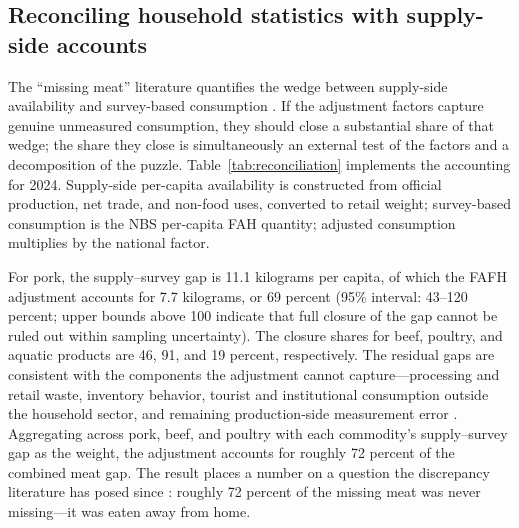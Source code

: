 \documentclass[preprint,12pt,authoryear]{elsarticle}
\begin{document}
\begin{table}[htbp]
\begin{threeparttable}
\begin{tablenotes}[flushleft]
\end{tablenotes}
\end{threeparttable}
\end{table}

\subsection{Reconciling household statistics with supply-side accounts}
\label{subsec:app_reconciliation}

The ``missing meat'' literature quantifies the wedge between supply-side availability and survey-based consumption \citep{MaHuangRozelle2004, YuAbler2014, Xiao2015}. If the adjustment factors capture genuine unmeasured consumption, they should close a substantial share of that wedge; the share they close is simultaneously an external test of the factors and a decomposition of the puzzle. Table~\ref{tab:reconciliation} implements the accounting for 2024. Supply-side per-capita availability is constructed from official production, net trade, and non-food uses, converted to retail weight; survey-based consumption is the NBS per-capita FAH quantity; adjusted consumption multiplies by the national factor.

For pork, the supply--survey gap is 11.1 kilograms per capita, of which the FAFH adjustment accounts for 7.7 kilograms, or 69 percent (95\% interval: 43--120 percent; upper bounds above 100 indicate that full closure of the gap cannot be ruled out within sampling uncertainty). The closure shares for beef, poultry, and aquatic products are 46, 91, and 19 percent, respectively. The residual gaps are consistent with the components the adjustment cannot capture---processing and retail waste, inventory behavior, tourist and institutional consumption outside the household sector, and remaining production-side measurement error \citep{MaHuangRozelle2004}. Aggregating across pork, beef, and poultry with each commodity's supply--survey gap as the weight, the adjustment accounts for roughly 72 percent of the combined meat gap. The result places a number on a question the discrepancy literature has posed since \citet{YuAbler2014}: roughly 72 percent of the missing meat was never missing---it was eaten away from home.
\end{document}
